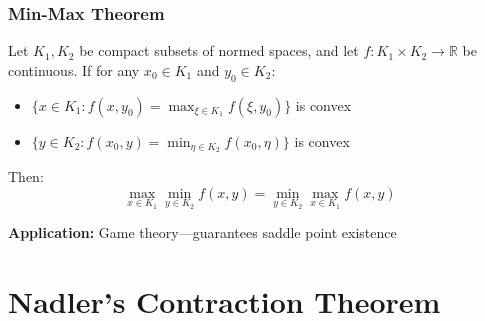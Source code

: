 \documentclass[aspectratio=169,10pt]{beamer}
\begin{document}
\begin{frame}
\frametitle{Min-Max Theorem}

\begin{theorem}
Let $K_1, K_2$ be compact subsets of normed spaces, and let $f: K_1 \times K_2 \to \mathbb{R}$ be continuous.
If for any $x_0 \in K_1$ and $y_0 \in K_2$:
\begin{itemize}
    \item $\{x \in K_1 : f(x, y_0) = \max_{\xi \in K_1} f(\xi, y_0)\}$ is convex
    \item $\{y \in K_2 : f(x_0, y) = \min_{\eta \in K_2} f(x_0, \eta)\}$ is convex
\end{itemize}
Then:
\[
\max_{x \in K_1} \min_{y \in K_2} f(x,y) = \min_{y \in K_2} \max_{x \in K_1} f(x,y)
\]
\end{theorem}

\vspace{0.3cm}

\textbf{Application:} Game theory—guarantees saddle point existence

\end{frame}


\section{Nadler's Contraction Theorem}
\end{document}

